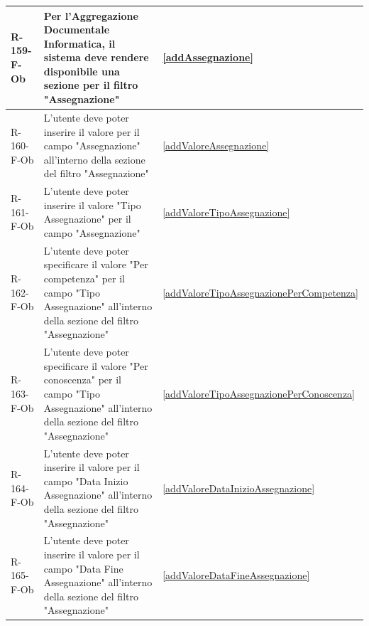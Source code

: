 \begin{longtable}{|p{2.5cm}|p{9.5cm}|p{2.5cm}|}
\hline
R-159-F-Ob & Per l'Aggregazione Documentale Informatica, il sistema deve rendere disponibile una sezione per il filtro "Assegnazione" & \ref{addAssegnazione} \\
\hline
R-160-F-Ob & L'utente deve poter inserire il valore per il campo "Assegnazione" all'interno della sezione del filtro "Assegnazione" & \ref{addValoreAssegnazione} \\
\hline
R-161-F-Ob & L'utente deve poter inserire il valore "Tipo Assegnazione" per il campo "Assegnazione" & \ref{addValoreTipoAssegnazione} \\
\hline
R-162-F-Ob & L'utente deve poter specificare il valore "Per competenza" per il campo "Tipo Assegnazione" all'interno della sezione del filtro "Assegnazione" & \ref{addValoreTipoAssegnazionePerCompetenza} \\
\hline
R-163-F-Ob & L'utente deve poter specificare il valore "Per conoscenza" per il campo "Tipo Assegnazione" all'interno della sezione del filtro "Assegnazione" & \ref{addValoreTipoAssegnazionePerConoscenza} \\
\hline
R-164-F-Ob & L'utente deve poter inserire il valore per il campo "Data Inizio Assegnazione" all'interno della sezione del filtro "Assegnazione" & \ref{addValoreDataInizioAssegnazione} \\
\hline
R-165-F-Ob & L'utente deve poter inserire il valore per il campo "Data Fine Assegnazione" all'interno della sezione del filtro "Assegnazione" & \ref{addValoreDataFineAssegnazione} \\
\hline



\end{longtable}
